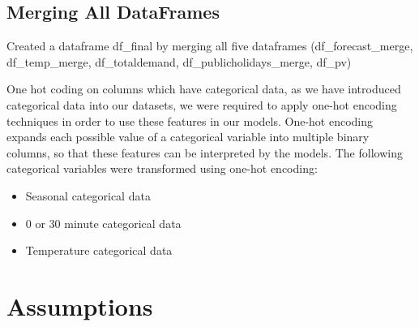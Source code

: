 \documentclass[mstat,12pt]{unswthesis}
\begin{document}
\hypertarget{merging-all-dataframes}{%
\subsection{Merging All DataFrames}\label{merging-all-dataframes}}

Created a dataframe df\_final by merging all five dataframes
(df\_forecast\_merge, df\_temp\_merge, df\_totaldemand,
df\_publicholidays\_merge, df\_pv)

One hot coding on columns which have categorical data, as we have
introduced categorical data into our datasets, we were required to apply
one-hot encoding techniques in order to use these features in our
models. One-hot encoding expands each possible value of a categorical
variable into multiple binary columns, so that these features can be
interpreted by the
models\cite{httpswwwfacebookcommachinelearningmastery_2017_why}. The
following categorical variables were transformed using one-hot encoding:

\begin{itemize}
\item Seasonal categorical data
\item 0 or 30 minute categorical data
\item Temperature categorical data
\end{itemize}

\hypertarget{assumptions}{%
\section{Assumptions}\label{assumptions}}
\end{document}
